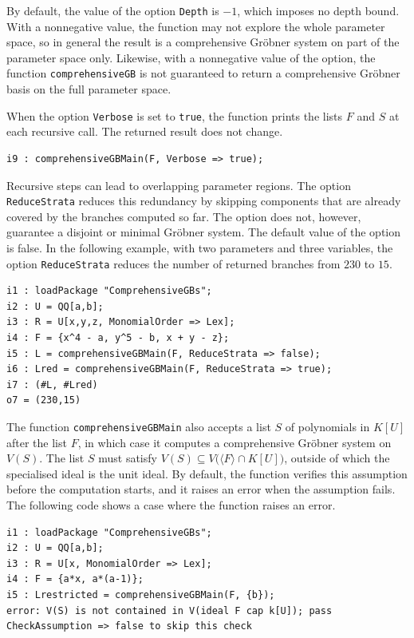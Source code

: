 \documentclass[11pt]{amsart}
\theoremstyle{plain}
\theoremstyle{definition}
\theoremstyle{remark}
\begin{document}
By default, the value of the option \texttt{Depth} is $-1$, which imposes no depth bound.
With a nonnegative value, the function
may not explore the whole parameter space, so in general the result is a comprehensive Gröbner system on part of the parameter space only.
Likewise, with a nonnegative value of the option, the function \texttt{comprehensiveGB} is not guaranteed to return a comprehensive Gröbner basis on the full parameter space.

When the option \texttt{Verbose} is set to \texttt{true},
the function prints the lists $F$ and $S$
at each recursive call. The returned result does not change.
\begin{lstlisting}
i9 : comprehensiveGBMain(F, Verbose => true);
\end{lstlisting}

Recursive steps can lead to overlapping parameter regions.
The option \texttt{ReduceStrata} reduces this
redundancy by skipping components that are already
covered by the branches computed so far. The option does not, however, guarantee a disjoint or minimal Gröbner system. The default value of the option is false. In the following example, with two parameters and three variables, the option \texttt{ReduceStrata} reduces the number of returned branches from $230$ to $15$.

\begin{lstlisting}
i1 : loadPackage "ComprehensiveGBs";
i2 : U = QQ[a,b];
i3 : R = U[x,y,z, MonomialOrder => Lex];
i4 : F = {x^4 - a, y^5 - b, x + y - z};
i5 : L = comprehensiveGBMain(F, ReduceStrata => false);
i6 : Lred = comprehensiveGBMain(F, ReduceStrata => true);
i7 : (#L, #Lred)
o7 = (230,15)
\end{lstlisting}

The function \texttt{comprehensiveGBMain} also accepts a list $S$ of polynomials in $K[U]$ after the list $F$, in which case it computes a comprehensive Gröbner system on $V(S)$.
The list $S$ must satisfy
$V(S)\subseteq V\bigl(\langle F\rangle\cap K[U]\bigr)$,
outside of which the specialised ideal is the unit ideal.
By default, the function verifies this assumption before the computation starts, and it raises an error when the assumption fails.
The following code shows a case where the function raises an error.
\begin{lstlisting}[breaklines=true, breakatwhitespace=true]
i1 : loadPackage "ComprehensiveGBs";
i2 : U = QQ[a,b];
i3 : R = U[x, MonomialOrder => Lex];
i4 : F = {a*x, a*(a-1)};
i5 : Lrestricted = comprehensiveGBMain(F, {b});
error: V(S) is not contained in V(ideal F cap k[U]); pass CheckAssumption => false to skip this check
\end{lstlisting}
\end{document}
